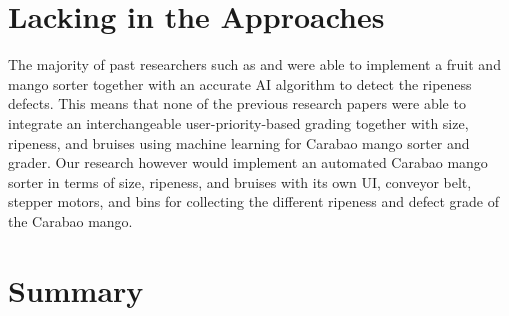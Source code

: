\section{Lacking in the Approaches}

The majority of past researchers such as \citet{amna-et-al-machine-2023} and \citet{guillermo-determining-2019} were able to implement a fruit and mango sorter together with an accurate AI
algorithm to detect the ripeness defects. This means that none of the previous research
papers were able to integrate an interchangeable user-priority-based grading together
with size, ripeness, and bruises using machine learning for Carabao mango sorter and
grader. Our research however would implement an automated Carabao mango sorter in
terms of size, ripeness, and bruises with its own UI, conveyor belt, stepper motors, and
bins for collecting the different ripeness and defect grade of the Carabao mango.

\section{Summary}

